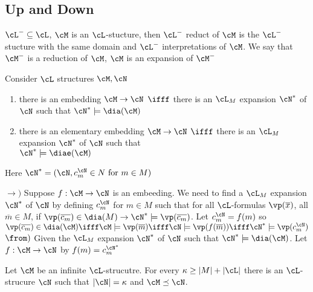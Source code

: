 
\subsection{Up and Down}

\begin{definition}
    $\cL^- \subseteq \cL$, $\cM$ is an $\cL$-stucture, then $\cL^-$ reduct of $\cM$ is the $\cL^-$ stucture with the same domain and $\cL^-$ interpretations of $\cM$. We say that $\cM^-$ is a reduction of $\cM$, $\cM$ is an expansion of $\cM^-$  
\end{definition}

\begin{lemma}
    Consider $\cL$ structures $\cM, \cN$ 
    \begin{enumerate}
        \item there is an embedding $\cM \to \cN$ $\ifff$ there is an $\cL_M$ expansion $\cN^*$ of $\cN$ such that $\cN^* \models \dia(\cM)$ 
        \item there is an elementary embedding $\cM \to \cN$ $\ifff$ there is an $\cL_M$ expansion $\cN^*$ of $\cN$ such that\\ $\cN^* \models \diae(\cM)$
    \end{enumerate}
\end{lemma}

\noindent
Here $\cN^* = (\cN, c_m^{\cN} \in N \text{ for }m \in M)$ 

\begin{pf}
     $\to)$ Suppose $f: \cM \to \cN$ is an embeeding. We need to find a $\cL_M$ expansion $\cN^*$ of $\cN$ by defining $c_m^{\cN}$ for $m \in M$ such that for all $\cL$-formulas $\vp(\overline{x})$, all $\overline{m} \in M$, if $\vp(\overline{c_m}) \in \dia(M) \to \cN^* \models \vp(\overline{c_m})$. Let $c_m^{\cN}=f(m)$ so $\vp(\overline{c_m}) \in \dia(\cM) \ifff \cM \models \vp(\overline{m}) \ifff \cN \models \vp(f(\overline{m})) \ifff \cN^* \models \vp(c_m^{\cN})$ \\
     $\from)$ Given the $\cL_M$ expansion $\cN^*$ of $\cN$ such that $\cN^* \models \dia(\cM)$. Let $f: \cM \to \cN$ by $f(m) = c_m^{\cN^*}$ 
\end{pf}

\begin{theorem}
    Let $\cM$ be an infinite $\cL$-strucutre. For every $\kappa \ge |M| + |\cL|$ there is an $\cL$-strucure $\cN$ such that $|\cN| = \kappa $ and $\cM \preceq \cN$.
\end{theorem}

